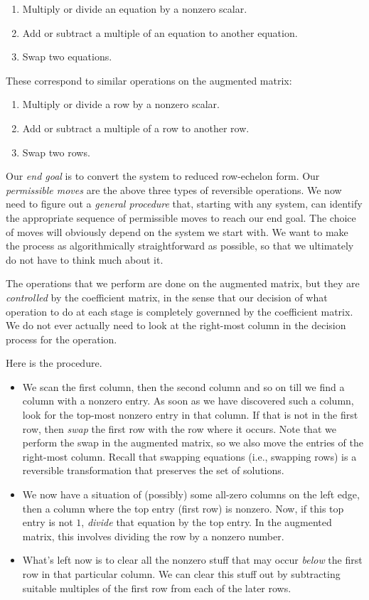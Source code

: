 \documentclass[10pt]{amsart}
\begin{document}
\begin{enumerate}
\item Multiply or divide an equation by a nonzero scalar.
\item Add or subtract a multiple of an equation to another equation.
\item Swap two equations.
\end{enumerate}

These correspond to similar operations on the augmented matrix:

\begin{enumerate}
\item Multiply or divide a row by a nonzero scalar.
\item Add or subtract a multiple of a row to another row.
\item Swap two rows.
\end{enumerate}

Our {\em end goal} is to convert the system to reduced row-echelon
form. Our {\em permissible moves} are the above three types of
reversible operations. We now need to figure out a {\em general
  procedure} that, starting with any system, can identify the
appropriate sequence of permissible moves to reach our end goal. The
choice of moves will obviously depend on the system we start with. We
want to make the process as algorithmically straightforward as
possible, so that we ultimately do not have to think much about it.

The operations that we perform are done on the augmented matrix, but
they are {\em controlled} by the coefficient matrix, in the sense that
our decision of what operation to do at each stage is completely
governned by the coefficient matrix. We do not ever actually need to
look at the right-most column in the decision process for the
operation.

Here is the procedure. 

\begin{itemize}
\item We scan the first column, then the second column and so on till
  we find a column with a nonzero entry. As soon as we have discovered
  such a column, look for the top-most nonzero entry in that
  column. If that is not in the first row, then {\em swap} the first
  row with the row where it occurs. Note that we perform the swap in
  the augmented matrix, so we also move the entries of the right-most
  column. Recall that swapping equations (i.e., swapping rows) is a
  reversible transformation that preserves the set of solutions.

\item We now have a situation of (possibly) some all-zero columns on
  the left edge, then a column where the top entry (first row) is
  nonzero. Now, if this top entry is not $1$, {\em divide} that
  equation by the top entry. In the augmented matrix, this involves
  dividing the row by a nonzero number.

\item What's left now is to clear all the nonzero stuff that may occur {\em
  below} the first row in that particular column. We can clear this
  stuff out by subtracting suitable multiples of the first row from each
  of the later rows.
\end{itemize}
\end{document}
